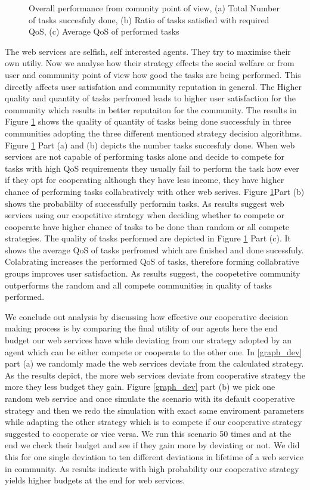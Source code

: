 \documentclass[runningheads,a4paper]{llncs}
\begin{document}
\begin{figure}
\caption{Overall performance from comunity point of view, (a) Total Number of tasks succesfuly done, (b) Ratio of tasks satisfied with required QoS, (c) Average QoS of performed tasks} \label{graph_task}
\end{figure}

The web services are selfish, self interested agents. They try to maximise their own utiliy. Now we analyse how their strategy effects the social welfare or from user and community point of view how good the tasks are being performed. This directly affects user satisfation and community reputation in general. The Higher  quality and quantity of tasks perfromed leads to higher user satisfaction for the community which results in better reputaiton for the community. The results in Figure \ref{graph_task} shows the quality of quantity of tasks being done successfuly in three communities adopting the three different mentioned strategy decision algorithms. Figure \ref{graph_task} Part (a) and (b) depicts the number tasks succesfuly done. When web services are not capable of performing tasks alone and decide to compete for tasks with high QoS requirements they usually fail to perform the task how ever if they opt for cooperating although they have less income, they have higher chance of performing tasks collabratively with other web serives. Figure \ref{graph_task}Part (b) shows the probablilty of successfully performin tasks. As results suggest web services using our coopetitive strategy when deciding whether to compete or cooperate have higher chance of tasks to be done than random or all compete strategies. The quality of tasks performed are depicted in Figure \ref{graph_task} Part (c). It shows the average QoS of tasks perfromed which are finished and done sucessfuly. Colabrating increases the performed QoS of tasks, therefore forming collabrative groups improves user satisfaction. As results suggest, the coopetetive community outperforms the random and all compete communities in quality of tasks performed.


We conclude out analysis by discussing how effective our cooperative decision making process is by comparing the final utility of our agents here the end budget our web services have while deviating from our strategy adopted by an agent which can be either compete or cooperate to the other one. In \ref{graph_dev} part (a) we randomly made the web services deviate from the calculated strategy. As the results depict, the more web services deviate from cooperative strategy the more they less budget they gain. Figure \ref{graph_dev} part (b) we pick one random web service and once simulate the scenario with its default cooperative strategy and then we redo the simulation with exact same enviroment parameters while adapting the other strategy which is to compete if our cooperative strategy suggested to cooperate or vice versa. We run this scenario 50 times and at the end we check their budget and see if they gain more by deviating or not. We did this for one single deviation to ten different deviations in lifetime of a web service in community. As results indicate with high probability our cooperative strategy yields higher budgets at the end for web services.
\end{document}
